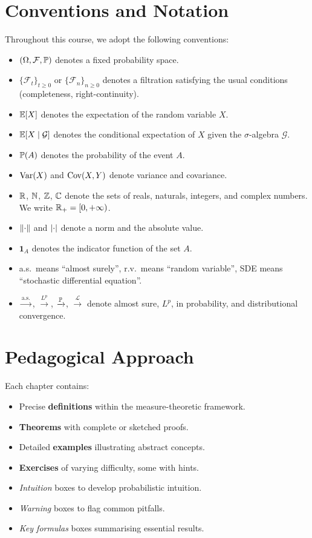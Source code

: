 \section*{Conventions and Notation}

Throughout this course, we adopt the following conventions:

\begin{itemize}
  \item $(\Omega, \mathcal{F}, \mathbb{P})$ denotes a fixed probability space.
  \item $\{\mathcal{F}_t\}_{t \geq 0}$ or $\{\mathcal{F}_n\}_{n \geq 0}$ denotes
    a filtration satisfying the usual conditions (completeness, right-continuity).
  \item $\mathbb{E}[X]$ denotes the expectation of the random variable $X$.
  \item $\mathbb{E}[X \mid \mathcal{G}]$ denotes the conditional expectation of $X$ given
    the $\sigma$-algebra $\mathcal{G}$.
  \item $\mathbb{P}(A)$ denotes the probability of the event $A$.
  \item $\mathrm{Var}(X)$ and $\mathrm{Cov}(X, Y)$ denote variance and covariance.
  \item $\mathbb{R}$, $\mathbb{N}$, $\mathbb{Z}$, $\mathbb{C}$ denote the sets of reals, naturals, integers,
    and complex numbers. We write $\mathbb{R}_+ = [0, +\infty)$.
  \item $\left\| \cdot \right\|$ and $\left| \cdot \right|$ denote a norm and the absolute value.
  \item $\mathbf{1}_A$ denotes the indicator function of the set $A$.
  \item a.s.\ means ``almost surely'', r.v.\ means ``random variable'',
    SDE means ``stochastic differential equation''.
  \item $\xrightarrow{\text{a.s.}}$, $\xrightarrow{L^p}$, $\xrightarrow{\mathbb{P}}$,
    $\xrightarrow{\mathcal{L}}$ denote almost sure, $L^p$, in probability, and
    distributional convergence.
\end{itemize}

\section*{Pedagogical Approach}

Each chapter contains:
\begin{itemize}
  \item Precise \textbf{definitions} within the measure-theoretic framework.
  \item \textbf{Theorems} with complete or sketched proofs.
  \item Detailed \textbf{examples} illustrating abstract concepts.
  \item \textbf{Exercises} of varying difficulty, some with hints.
  \item \emph{Intuition} boxes to develop probabilistic intuition.
  \item \emph{Warning} boxes to flag common pitfalls.
  \item \emph{Key formulas} boxes summarising essential results.
\end{itemize}

